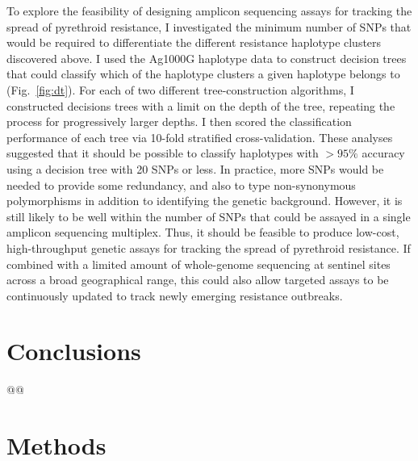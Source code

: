 \documentclass[a4paper,11pt,abstracton,hidelinks]{scrartcl}
\begin{document}
To explore the feasibility of designing amplicon sequencing assays for tracking the spread of pyrethroid resistance, I investigated the minimum number of SNPs that would be required to differentiate the different resistance haplotype clusters discovered above.
%
I used the Ag1000G haplotype data to construct decision trees that could classify which of the haplotype clusters a given haplotype belongs to (Fig.~\ref{fig:dt}).
%
For each of two different tree-construction algorithms, I constructed decisions trees with a limit on the depth of the tree, repeating the process for progressively larger depths.
%
I then scored the classification performance of each tree via 10-fold stratified cross-validation.
%
These analyses suggested that it should be possible to classify haplotypes with $>95\%$ accuracy using a decision tree with 20 SNPs or less.
%
In practice, more SNPs would be needed to provide some redundancy, and also to type non-synonymous polymorphisms in addition to identifying the genetic background.
%
However, it is still likely to be well within the number of SNPs that could be assayed in a single amplicon sequencing multiplex.
%
Thus, it should be feasible to produce low-cost, high-throughput genetic assays for tracking the spread of pyrethroid resistance.
%
If combined with a limited amount of whole-genome sequencing at sentinel sites across a broad geographical range, this could also allow targeted assays to be continuously updated to track newly emerging resistance outbreaks.



\section{Conclusions}\label{sec:conclusions}


@@


\section{Methods}\label{sec:methods}
\end{document}
